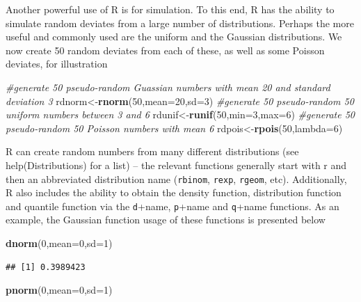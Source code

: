 \documentclass[
]{article}
\newenvironment{Shaded}{\begin{snugshade}}{\end{snugshade}}
\newcommand{\AttributeTok}[1]{\textcolor[rgb]{0.13,0.29,0.53}{#1}}
\newcommand{\CommentTok}[1]{\textcolor[rgb]{0.56,0.35,0.01}{\textit{#1}}}
\newcommand{\DecValTok}[1]{\textcolor[rgb]{0.00,0.00,0.81}{#1}}
\newcommand{\FunctionTok}[1]{\textcolor[rgb]{0.13,0.29,0.53}{\textbf{#1}}}
\newcommand{\NormalTok}[1]{#1}
\newcommand{\OtherTok}[1]{\textcolor[rgb]{0.56,0.35,0.01}{#1}}
\begin{document}
Another powerful use of R is for simulation. To this end, R has the
ability to simulate random deviates from a large number of
distributions. Perhaps the more useful and commonly used are the uniform
and the Gaussian distributions. We now create 50 random deviates from
each of these, as well as some Poisson deviates, for illustration

\begin{Shaded}
\begin{Highlighting}[]
\CommentTok{\#generate 50 pseudo{-}random Guassian numbers with mean 20 and standard deviation 3}
\NormalTok{rdnorm}\OtherTok{\textless{}{-}}\FunctionTok{rnorm}\NormalTok{(}\DecValTok{50}\NormalTok{,}\AttributeTok{mean=}\DecValTok{20}\NormalTok{,}\AttributeTok{sd=}\DecValTok{3}\NormalTok{)}
\CommentTok{\#generate 50 pseudo{-}random  50 uniform numbers between 3 and 6}
\NormalTok{rdunif}\OtherTok{\textless{}{-}}\FunctionTok{runif}\NormalTok{(}\DecValTok{50}\NormalTok{,}\AttributeTok{min=}\DecValTok{3}\NormalTok{,}\AttributeTok{max=}\DecValTok{6}\NormalTok{)}
\CommentTok{\#generate 50 pseudo{-}random  50 Poisson numbers with mean 6}
\NormalTok{rdpois}\OtherTok{\textless{}{-}}\FunctionTok{rpois}\NormalTok{(}\DecValTok{50}\NormalTok{,}\AttributeTok{lambda=}\DecValTok{6}\NormalTok{)}
\end{Highlighting}
\end{Shaded}

R can create random numbers from many different distributions (see
help(Distributions) for a list) -- the relevant functions generally
start with r and then an abbreviated distribution name (\texttt{rbinom},
\texttt{rexp}, \texttt{rgeom}, etc). Additionally, R also includes the
ability to obtain the density function, distribution function and
quantile function via the \texttt{d}+name, \texttt{p}+name and
\texttt{q}+name functions. As an example, the Gaussian function usage of
these functions is presented below

\begin{Shaded}
\begin{Highlighting}[]
\FunctionTok{dnorm}\NormalTok{(}\DecValTok{0}\NormalTok{,}\AttributeTok{mean=}\DecValTok{0}\NormalTok{,}\AttributeTok{sd=}\DecValTok{1}\NormalTok{)}
\end{Highlighting}
\end{Shaded}

\begin{verbatim}
## [1] 0.3989423
\end{verbatim}

\begin{Shaded}
\begin{Highlighting}[]
\FunctionTok{pnorm}\NormalTok{(}\DecValTok{0}\NormalTok{,}\AttributeTok{mean=}\DecValTok{0}\NormalTok{,}\AttributeTok{sd=}\DecValTok{1}\NormalTok{)}
\end{Highlighting}
\end{Shaded}
\end{document}
